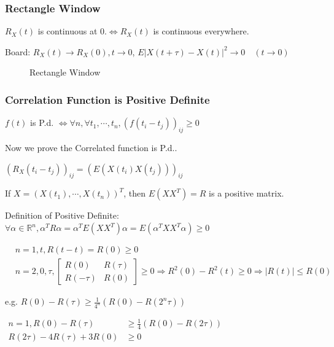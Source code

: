 \documentclass[a4paper]{article}
\begin{document}
\subsubsection*{Rectangle Window}
$R_X(t)$ is continuous at $0$.$\Longleftrightarrow R_X(t)$ is continuous everywhere.

Board: $R_X(t)\rightarrow R_X(0), t\to 0$, $E|X(t+\tau)-X(t)|^2\to 0\quad(t\to 0)$

\begin{figure}[H]
\centering
{}
\caption{Rectangle Window}
\end{figure}

\subsubsection*{Correlation Function is Positive Definite}
$f(t)$ is P.d. $\Longleftrightarrow \forall n, \forall t_1, \cdots, t_n, (f(t_i-t_j))_{ij}\geq 0$

Now we prove the Correlated function is P.d..

$(R_X(t_i-t_j))_{ij}=(E(X(t_i)X(t_j)))_{ij}$

If $X=(X(t_1), \cdots, X(t_n))^T$, then $E(XX^T)=R$ is a positive matrix.

Definition of Positive Definite: $\forall \alpha\in \mathbb{R}^n, \alpha^T R\alpha=\alpha^TE(XX^T)\alpha=E(\alpha^T XX^T\alpha)\geq 0$

$$\begin{aligned}
  &n = 1, t,  R(t-t)=R(0)\geq 0\\
  &n=2, 0, \tau,
  \begin{bmatrix}
    R(0) & R(\tau) \\
    R(-\tau) & R(0)
  \end{bmatrix} \geq 0 \Rightarrow R^2(0)-R^2(t)\geq 0 \Rightarrow |R(t)| \leq R(0)
\end{aligned}$$

e.g.
$R(0)-R(\tau)\geq \frac{1}{4^n}(R(0)-R(2^n\tau))$


$\begin{aligned}
  n=1, R(0)-R(\tau)&\geq \frac{1}{4}(R(0)-R(2\tau)) \\
                   R(2\tau)-4R(\tau)+3R(0)&\geq 0
\end{aligned}$
\end{document}
